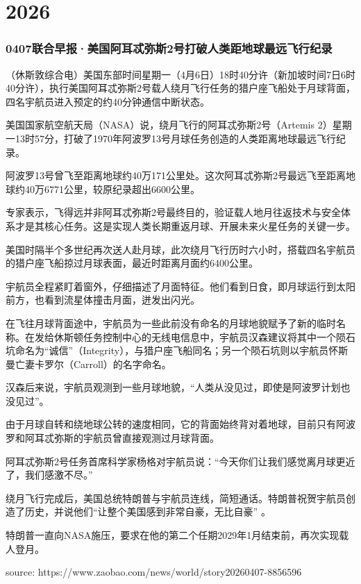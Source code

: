\part{2026}
\section{
    0407联合早报·美国阿耳忒弥斯2号打破人类距地球最远飞行纪录
} {
    \setlength{\parindent}{2em}
    （休斯敦综合电）美国东部时间星期一（4月6日）18时40分许（新加坡时间7日6时40分许），执行美国阿耳忒弥斯2号载人绕月飞行任务的猎户座飞船处于月球背面，四名宇航员进入预定的约40分钟通信中断状态。

美国国家航空航天局（NASA）说，绕月飞行的阿耳忒弥斯2号（Artemis 2）星期一13时57分，打破了1970年阿波罗13号月球任务创造的人类距离地球最远飞行纪录。

阿波罗13号曾飞至距离地球约40万171公里处。这次阿耳忒弥斯2号最远飞至距离地球约40万6771公里，较原纪录超出6600公里。

专家表示，飞得远并非阿耳忒弥斯2号最终目的，验证载人地月往返技术与安全体系才是其核心任务。这是实现人类长期重返月球、开展未来火星任务的关键一步。

美国时隔半个多世纪再次送人赴月球，此次绕月飞行历时六小时，搭载四名宇航员的猎户座飞船掠过月球表面，最近时距离月面约6400公里。

宇航员全程紧盯着窗外，仔细描述了月面特征。他们看到日食，即月球运行到太阳前方，也看到流星体撞击月面，迸发出闪光。

在飞往月球背面途中，宇航员为一些此前没有命名的月球地貌赋予了新的临时名称。在发给休斯顿任务控制中心的无线电信息中，宇航员汉森建议将其中一个陨石坑命名为“诚信”（Integrity），与猎户座飞船同名；另一个陨石坑则以宇航员怀斯曼亡妻卡罗尔（Carroll）的名字命名。

汉森后来说，宇航员观测到一些月球地貌，“人类从没见过，即使是阿波罗计划也没见过”。

由于月球自转和绕地球公转的速度相同，它的背面始终背对着地球，目前只有阿波罗和阿耳忒弥斯的宇航员曾直接观测过月球背面。

阿耳忒弥斯2号任务首席科学家杨格对宇航员说：“今天你们让我们感觉离月球更近了，我们感激不尽。”

绕月飞行完成后，美国总统特朗普与宇航员连线，简短通话。特朗普祝贺宇航员创造了历史，并说他们“让整个美国感到非常自豪，无比自豪” 。

特朗普一直向NASA施压，要求在他的第二个任期2029年1月结束前，再次实现载人登月。

source: https://www.zaobao.com/news/world/story20260407-8856596
}